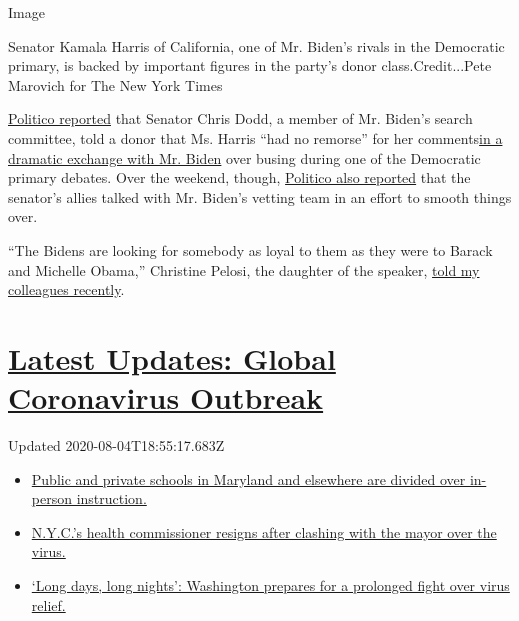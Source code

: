 Image

Senator Kamala Harris of California, one of Mr. Biden's rivals in the
Democratic primary, is backed by important figures in the party's donor
class.Credit...Pete Marovich for The New York Times

\href{https://www.politico.com/news/2020/07/27/kamala-harris-biden-vp-381829}{Politico
reported} that Senator Chris Dodd, a member of Mr. Biden's search
committee, told a donor that Ms. Harris ``had no remorse'' for her
comments\href{https://www.nytimes.com/2019/06/28/us/kamala-harris-debate.html}{in
a dramatic exchange with Mr. Biden} over busing during one of the
Democratic primary debates. Over the weekend, though,
\href{https://www.politico.com/news/2020/07/31/harris-allies-biden-call-dodd-389848}{Politico
also reported} that the senator's allies talked with Mr. Biden's vetting
team in an effort to smooth things over.

``The Bidens are looking for somebody as loyal to them as they were to
Barack and Michelle Obama,'' Christine Pelosi, the daughter of the
speaker,
\href{https://www.nytimes.com/2020/07/31/us/politics/joseph-biden-vice-president.html}{told
my colleagues recently}.

\hypertarget{latest-updates-global-coronavirus-outbreak}{%
\section{\texorpdfstring{\href{https://www.nytimes.com/2020/08/04/world/coronavirus-cases.html?action=click\&pgtype=Article\&state=default\&region=MAIN_CONTENT_1\&context=storylines_live_updates}{Latest
Updates: Global Coronavirus
Outbreak}}{Latest Updates: Global Coronavirus Outbreak}}\label{latest-updates-global-coronavirus-outbreak}}

Updated 2020-08-04T18:55:17.683Z

\begin{itemize}
\tightlist
\item
  \href{https://www.nytimes.com/2020/08/04/world/coronavirus-cases.html?action=click\&pgtype=Article\&state=default\&region=MAIN_CONTENT_1\&context=storylines_live_updates\#link-4825b93}{Public
  and private schools in Maryland and elsewhere are divided over
  in-person instruction.}
\item
  \href{https://www.nytimes.com/2020/08/04/world/coronavirus-cases.html?action=click\&pgtype=Article\&state=default\&region=MAIN_CONTENT_1\&context=storylines_live_updates\#link-4d1eafa8}{N.Y.C.'s
  health commissioner resigns after clashing with the mayor over the
  virus.}
\item
  \href{https://www.nytimes.com/2020/08/04/world/coronavirus-cases.html?action=click\&pgtype=Article\&state=default\&region=MAIN_CONTENT_1\&context=storylines_live_updates\#link-6b644638}{`Long
  days, long nights': Washington prepares for a prolonged fight over
  virus relief.}
\end{itemize}

